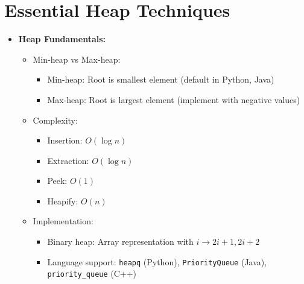 \documentclass[a4paper,10pt]{book}
\begin{document}
\chapter{Essential Heap Techniques }
\label{sec:heap}
\begin{itemize}
    \item \textbf{Heap Fundamentals:}
    \begin{itemize}
        \item Min-heap vs Max-heap:
        \begin{itemize}
            \item Min-heap: Root is smallest element (default in Python, Java)
            \item Max-heap: Root is largest element (implement with negative values)
        \end{itemize}
        \item Complexity:
        \begin{itemize}
            \item Insertion: $O(\log n)$
            \item Extraction: $O(\log n)$
            \item Peek: $O(1)$
            \item Heapify: $O(n)$
        \end{itemize}
        \item Implementation:
        \begin{itemize}
            \item Binary heap: Array representation with $i \rightarrow 2i+1, 2i+2$
            \item Language support: \texttt{heapq} (Python), \texttt{PriorityQueue} (Java), \texttt{priority\_queue} (C++)
        \end{itemize}
    \end{itemize}
    

\end{itemize}
\end{document}
